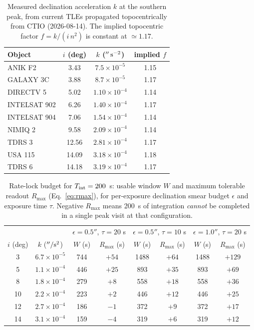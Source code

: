 \documentclass[11pt]{article}
\newcommand{\arcsecs}{\ensuremath{''}}
\begin{document}
\begin{table}[ht]
\centering
\caption{Measured declination acceleration $k$ at the southern peak, from current TLEs
propagated topocentrically from CTIO (2026-08-14). The implied topocentric factor
$f = k/(i\,n^{2})$ is constant at $\simeq 1.17$.}
\label{tab:meas}
\begin{tabular}{lccc}
\toprule
Object & $i$ (deg) & $k$ ($\arcsecs\,{\rm s}^{-2}$) & implied $f$ \\
\midrule
ANIK F2        &  3.43 & $7.5\times10^{-5}$ & 1.15 \\
GALAXY 3C      &  3.88 & $8.7\times10^{-5}$ & 1.17 \\
DIRECTV 5      &  5.02 & $1.10\times10^{-4}$ & 1.14 \\
INTELSAT 902   &  6.26 & $1.40\times10^{-4}$ & 1.17 \\
INTELSAT 904   &  7.06 & $1.54\times10^{-4}$ & 1.14 \\
NIMIQ 2        &  9.58 & $2.09\times10^{-4}$ & 1.14 \\
TDRS 3         & 12.56 & $2.81\times10^{-4}$ & 1.17 \\
USA 115        & 14.09 & $3.18\times10^{-4}$ & 1.18 \\
TDRS 6         & 14.18 & $3.19\times10^{-4}$ & 1.17 \\
\bottomrule
\end{tabular}
\end{table}

\begin{table}[ht]
\centering
\caption{Rate-lock budget for $T_{\rm int}=200$~s: usable window $W$ and maximum
tolerable readout $R_{\max}$ (Eq.~\ref{eq:rmax}), for per-exposure declination smear
budget $\epsilon$ and exposure time $\tau$. Negative $R_{\max}$ means 200~s of
integration \emph{cannot} be completed in a single peak visit at that configuration.}
\label{tab:budget}
\begin{tabular}{cc|cc|cc|cc}
\toprule
& & \multicolumn{2}{c|}{$\epsilon=0.5\arcsecs$, $\tau=20$ s}
  & \multicolumn{2}{c|}{$\epsilon=0.5\arcsecs$, $\tau=10$ s}
  & \multicolumn{2}{c}{$\epsilon=1.0\arcsecs$, $\tau=20$ s} \\
$i$ (deg) & $k$ ($\arcsecs/{\rm s}^2$) & $W$ (s) & $R_{\max}$ (s) & $W$ (s) & $R_{\max}$ (s) & $W$ (s) & $R_{\max}$ (s) \\
\midrule
 3 & $6.7\times10^{-5}$  &  744 & $+54$ & 1488 & $+64$ & 1488 & $+129$ \\
 5 & $1.1\times10^{-4}$  &  446 & $+25$ &  893 & $+35$ &  893 & $+69$  \\
 8 & $1.8\times10^{-4}$  &  279 & $+8$  &  558 & $+18$ &  558 & $+36$  \\
10 & $2.2\times10^{-4}$  &  223 & $+2$  &  446 & $+12$ &  446 & $+25$  \\
12 & $2.7\times10^{-4}$  &  186 & $-1$  &  372 & $+9$  &  372 & $+17$  \\
14 & $3.1\times10^{-4}$  &  159 & $-4$  &  319 & $+6$  &  319 & $+12$  \\
\bottomrule
\end{tabular}
\end{table}
\end{document}
